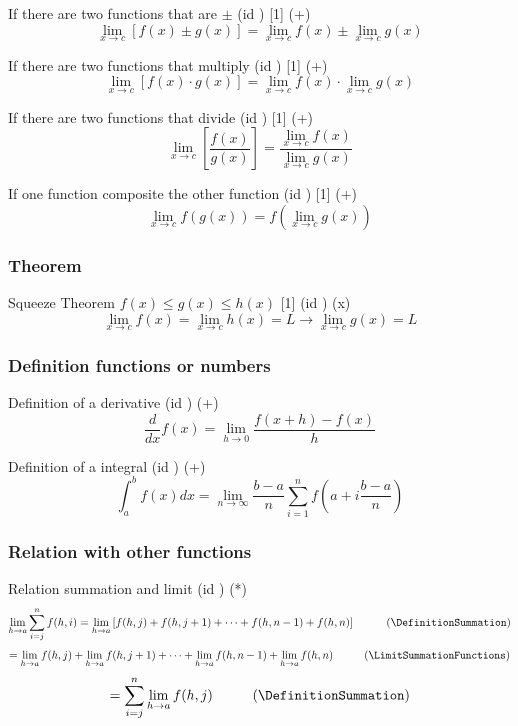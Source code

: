 \documentclass{book}
\begin{document}
                    If there are two functions that are $\pm$ (id \LimitSummationFunctions) [1] (+)
                    \[\lim_{x \rightarrow c} [f(x) \pm g(x)] = \lim_{x \rightarrow c} f(x) \pm \lim_{x \rightarrow c} g(x)\]
    
                    If there are two functions that multiply (id \LimitFunctionsMultiply) [1] (+)
                    \[\lim_{x \rightarrow c} [f(x) \cdot g(x)] = \lim_{x \rightarrow c} f(x) \cdot \lim_{x \rightarrow c} g(x)\]
    
                    If there are two functions that divide (id \LimitDivideFunctions) [1] (+)
                    \[\lim_{x \rightarrow c} \left[\frac{f(x)}{g(x)}\right] = \frac{\lim_{x \rightarrow c} f(x)}{\lim_{x \rightarrow c} g(x)}\]
    
                    If one function composite the other function (id \LimitCompositeFunction) [1] (+)
                    \[\lim_{x \rightarrow c} f(g(x)) = f(\lim_{x \rightarrow c} g(x))\]                   

                \subsubsection{Theorem}
                    Squeeze Theorem $f(x) \leq g(x) \leq h(x)$ [1] (id \SqueezeTheorem) (x)
                    \[\lim_{x \rightarrow c} f(x) = \lim_{x \rightarrow c} h(x) = L \rightarrow \lim_{x \rightarrow c} g(x) = L\]

                \subsubsection{Definition functions or numbers}
                    Definition of a derivative (id \LimitDefinitionDerivative) (+)
                    \[\frac{d}{dx} f(x) = \lim_{h \rightarrow 0} \frac{f(x + h) - f(x)}{h}\]

                    Definition of a integral (id \DefinitionIntegral) (+)
                    \[\int^b_a f(x) dx = \lim_{n \rightarrow \infty} \frac{b - a}{n} \sum^n_{i=1} f\left(a + i \frac{b - a}{n}\right)\]

                \subsubsection{Relation with other functions}
                    Relation summation and limit (id \RelationSummationLimit) (*)
                    \[\lim_{h \rightarrow a} \sum^{n}_{i=j} f(h, i) = \lim_{h \rightarrow a} \left[f(h, j) + f(h, j + 1) + \cdots + f(h, n - 1) + f(h, n)\right] \hspace{1cm} (\DefinitionSummation)\]
                    \[= \lim_{h \rightarrow a} f(h, j) + \lim_{h \rightarrow a} f(h, j + 1) + \cdots + \lim_{h \rightarrow a} f(h, n - 1) + \lim_{h \rightarrow a} f(h, n) \hspace{1cm} (\LimitSummationFunctions)\]
                    \[= \sum^n_{i=j} \lim_{h \rightarrow a} f(h, j) \hspace{1cm} (\DefinitionSummation)\]
        
\end{document}

